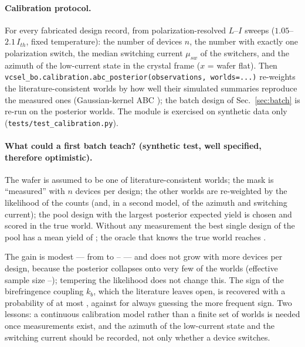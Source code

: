 \paragraph{Calibration protocol.} For every fabricated design record, from polarization-resolved $L$--$I$ sweeps ($1.05$--$2.1\,I_{th}$, fixed temperature): the number of devices $n$, the number with exactly one polarization switch, the median switching current $\mu_{sw}$ of the switchers, and the azimuth of the low-current state in the crystal frame ($x$ = wafer flat).
Then \texttt{vcsel\_bo.calibration.abc\_posterior(observations, worlds=...)} re-weights the literature-consistent worlds by how well their simulated summaries reproduce the measured ones (Gaussian-kernel ABC \cite{beaumont2002}); the batch design of Sec.~\ref{sec:batch} is re-run on the posterior worlds. The module is exercised on synthetic data only (\texttt{tests/test\_calibration.py}).
\paragraph{What could a first batch teach? (synthetic test, well specified, therefore optimistic).} The wafer is assumed to be one of \voiNWorlds{} literature-consistent worlds; the mask is ``measured'' with $n$ devices per design; the other worlds are re-weighted by the likelihood of the counts (and, in a second model, of the azimuth and switching current); the pool design with the largest posterior expected yield is chosen and scored in the true world.
Without any measurement the best single design of the pool has a mean yield of \voiNone{}; the oracle that knows the true world reaches \voiOracle{}.
\begin{table}[H]\centering\small\resizebox{\textwidth}{!}{\tabVOI}\caption{A synthetic first batch. Yield of the design chosen after the measurement (no measurement: \voiNone; oracle: \voiOracle). Prior probability of the correct sign of $k_b$ from the base rate: \voiPriorSign.}\label{tab:voi}\end{table}
The gain is modest --- from \voiNone{} to \voiLo--\voiHi{} --- and does not grow with more devices per design, because the posterior collapses onto very few of the \voiNWorlds{} worlds (effective sample size \voiEssLo--\voiEssHi); tempering the likelihood does not change this. The sign of the birefringence coupling $k_b$, which the literature leaves open, is recovered with a probability of at most \voiSignHi{}, against \voiPriorSign{} for always guessing the more frequent sign.
Two lessons: a continuous calibration model rather than a finite set of worlds is needed once measurements exist, and the azimuth of the low-current state and the switching current should be recorded, not only whether a device switches.

